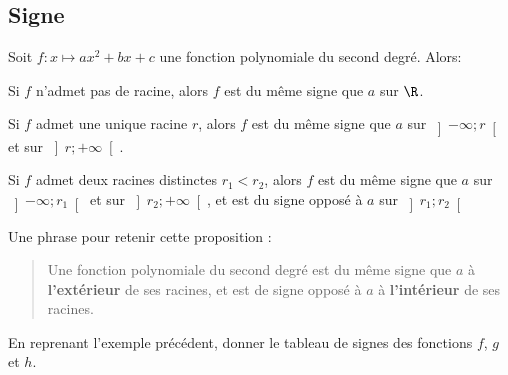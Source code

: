 \documentclass{article}
\begin{document}
\subsection{Signe}
\begin{proposition}
Soit $f : x \mapsto ax^2 + bx + c$ une fonction polynomiale du second degré. Alors:
\begin{enumquestions}
\item Si $f$ n'admet pas de racine, alors $f$ est du même signe que $a$ sur $\R$.
\item Si $f$ admet une unique racine $r$, alors $f$ est du même signe que $a$ sur $\left]-\infty;r\right[$ et sur $\left]r;+\infty\right[$.
\item Si $f$ admet deux racines distinctes $r_1 < r_2$, alors $f$ est du même signe que $a$ sur $\left]-\infty;r_1\right[$ et sur $\left]r_2;+\infty\right[$, et est du signe opposé à $a$ sur $\left]r_1;r_2\right[$
\end{enumquestions}
\end{proposition}
\begin{remark}
Une phrase pour retenir cette proposition :
\begin{tcolorbox}
\begin{quote}
Une fonction polynomiale du second degré est du même signe que $a$ à \textbf{l'extérieur} de ses racines, et est de signe opposé à $a$ à \textbf{l'intérieur} de ses racines.
\end{quote}
\end{tcolorbox}
\end{remark}
\begin{example}
En reprenant l'exemple précédent, donner le tableau de signes des fonctions $f$, $g$ et $h$.
\vspace*{0.5cm}

\emptybox{5cm}
\end{example}
\end{document}
